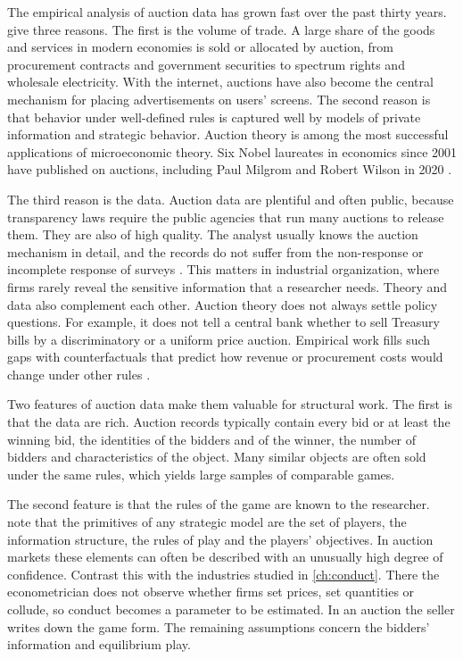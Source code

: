 The empirical analysis of auction data has grown fast over the past thirty years.
\citet[Section~1, pp.~83--84]{HortacsuPerrigne2021} give three reasons. The first is the volume of trade. A
large share of the goods and services in modern economies is sold or allocated by auction, from
procurement contracts and government securities to spectrum rights and wholesale electricity. With the
internet, auctions have also become the central mechanism for placing advertisements on users' screens.
The second reason is that behavior under well-defined rules is captured well by models of private
information and strategic behavior. Auction theory is among the most successful applications of
microeconomic theory. Six Nobel laureates in economics since 2001 have published on auctions, including
Paul Milgrom and Robert Wilson in 2020 \citep[p.~83]{HortacsuPerrigne2021}.

The third reason is the data. Auction data are plentiful and often public, because transparency laws
require the public agencies that run many auctions to release them. They are also of high quality. The
analyst usually knows the auction mechanism in detail, and the records do not suffer from the
non-response or incomplete response of surveys \citep[pp.~83--84]{HortacsuPerrigne2021}. This matters in
industrial organization, where firms rarely reveal the sensitive information that a researcher needs.
Theory and data also complement each other. Auction theory does not always settle policy questions. For
example, it does not tell a central bank whether to sell Treasury bills by a discriminatory or a uniform
price auction. Empirical work fills such gaps with counterfactuals that predict how revenue or
procurement costs would change under other rules \citep[p.~83]{HortacsuPerrigne2021}.

Two features of auction data make them valuable for structural work. The first is that the data are
rich. Auction records typically contain every bid or at least the winning bid, the identities of the
bidders and of the winner, the number of bidders and characteristics of the object. Many similar objects
are often sold under the same rules, which yields large samples of comparable games.

The second feature is that the rules of the game are known to the researcher. \citet[Section~1]{AtheyHaile2007}
note that the primitives of any strategic model are the set of players, the information structure, the
rules of play and the players' objectives. In auction markets these elements can often be described with
an unusually high degree of confidence. Contrast this with the industries studied in \cref{ch:conduct}.
There the econometrician does not observe whether firms set prices, set quantities or collude, so conduct
becomes a parameter to be estimated. In an auction the seller writes down the game form. The remaining
assumptions concern the bidders' information and equilibrium play.

